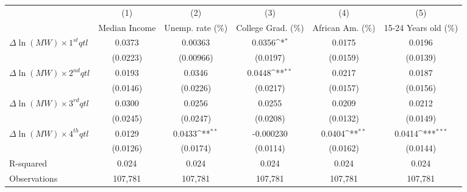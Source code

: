 {
\def\sym#1{\ifmmode^{#1}\else\(^{#1}\)\fi}
\begin{tabular}{l*{5}{c}}
\hline\hline
          &\multicolumn{1}{c}{(1)}&\multicolumn{1}{c}{(2)}&\multicolumn{1}{c}{(3)}&\multicolumn{1}{c}{(4)}&\multicolumn{1}{c}{(5)}\\
          &\multicolumn{1}{c}{Median Income}&\multicolumn{1}{c}{Unemp. rate (\%)}&\multicolumn{1}{c}{College Grad. (\%)}&\multicolumn{1}{c}{African Am. (\%)}&\multicolumn{1}{c}{15-24 Years old (\%)}\\
\hline
$\Delta \ln(MW) \times 1^{st} qtl$&   0.0373         &  0.00363         &   0.0356\sym{*}  &   0.0175         &   0.0196         \\
          & (0.0223)         &(0.00966)         & (0.0197)         & (0.0159)         & (0.0139)         \\
[1em]
$\Delta \ln(MW) \times 2^{nd} qtl$&   0.0193         &   0.0346         &   0.0448\sym{**} &   0.0217         &   0.0187         \\
          & (0.0146)         & (0.0226)         & (0.0217)         & (0.0157)         & (0.0156)         \\
[1em]
$\Delta \ln(MW) \times 3^{rd} qtl$&   0.0300         &   0.0256         &   0.0255         &   0.0209         &   0.0212         \\
          & (0.0245)         & (0.0247)         & (0.0208)         & (0.0132)         & (0.0149)         \\
[1em]
$\Delta \ln(MW) \times 4^{th} qtl$&   0.0129         &   0.0433\sym{**} &-0.000230         &   0.0404\sym{**} &   0.0414\sym{***}\\
          & (0.0126)         & (0.0174)         & (0.0114)         & (0.0162)         & (0.0144)         \\
\hline
R-squared &    0.024         &    0.024         &    0.024         &    0.024         &    0.024         \\
Observations&  107,781         &  107,781         &  107,781         &  107,781         &  107,781         \\
\hline\hline
\end{tabular}
}
